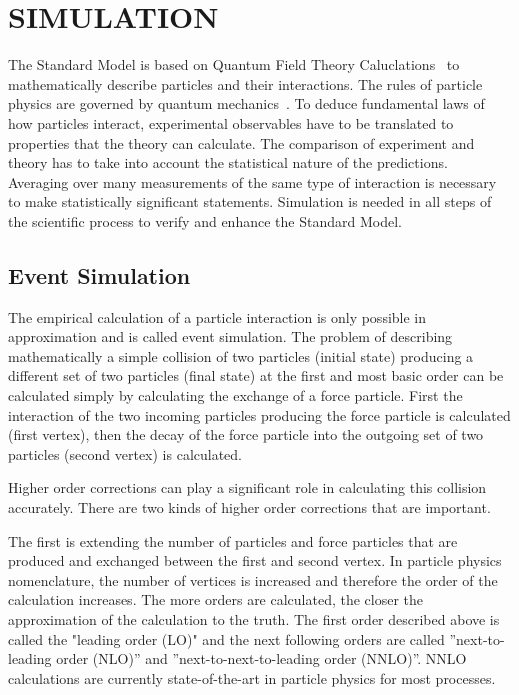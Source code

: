 \documentclass{wscpaperproc}
\theoremstyle{wsc}
\begin{document}
\section{SIMULATION}
\label{sec:simulation}

The Standard Model is based on Quantum Field Theory Caluclations~ to mathematically describe particles and their interactions. The rules of particle physics are governed by quantum mechanics~. To deduce fundamental laws of how particles interact, experimental observables have to be translated to properties that the theory can calculate. The comparison of experiment and theory has to take into account the statistical nature of the predictions. Averaging over many measurements of the same type of interaction is necessary to make statistically significant statements. Simulation is needed in all steps of the scientific process to verify and enhance the Standard Model.

\subsection{Event Simulation} 
\label{subsec:eventsimulation}

The empirical calculation of a particle interaction is only possible in approximation and is called event simulation. The problem of describing mathematically a simple collision of two particles (initial state) producing a different set of two particles (final state) at the first and most basic order can be calculated simply by calculating the exchange of a force particle. First the interaction of the two incoming particles producing the force particle is calculated (first vertex), then the decay of the force particle into the outgoing set of two particles (second vertex) is calculated.

Higher order corrections can play a significant role in calculating this collision accurately. There are two kinds of higher order corrections that are important. 

The first is extending the number of particles and force particles that are produced and exchanged between the first and second vertex. In particle physics nomenclature, the number of vertices is increased and therefore the order of the calculation increases. The more orders are calculated, the closer the approximation of the calculation to the truth. The first order described above is called the "leading order (LO)" and the next following orders are called ''next-to-leading order (NLO)'' and ''next-to-next-to-leading order (NNLO)''. NNLO calculations are currently state-of-the-art in particle physics for most processes.
\end{document}
